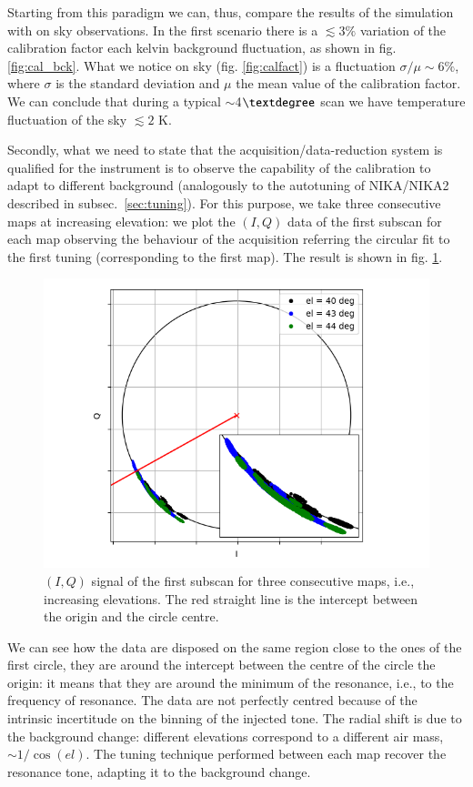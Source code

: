 \documentclass[twocolumn,traditabstract]{aa}\\
\begin{document}
Starting from this paradigm we can, thus, compare the results of the simulation with on sky observations. In the first scenario there is a $\lesssim 3\%$ variation of the calibration factor each kelvin background fluctuation, as shown in fig. \ref{fig:cal_bck}. What we notice on sky (fig. \ref{fig:calfact}) is a fluctuation $\sigma/\mu\sim6\%$, where $\sigma$ is the standard deviation and $\mu$ the mean value of the calibration factor. We can conclude that during a typical $\sim$4$\textdegree$ scan we have temperature fluctuation of the sky $\lesssim 2$ K.

Secondly, what we need to state that the acquisition/data-reduction system is qualified for the instrument is to observe the capability of the calibration to adapt to different background (analogously to the autotuning of NIKA/NIKA2 described in subsec.~\ref{sec:tuning}). For this purpose, we take three consecutive maps at increasing elevation: we plot the $(I,Q)$ data of the first subscan for each map observing the behaviour of the acquisition referring the circular fit to the first tuning (corresponding to the first map). The result is shown in fig. \ref{fig:autotuning}.

\begin{figure}[htf]
	\centering
	\includegraphics[width=.5\textwidth]{4.results/autotuning.png}
	\caption{$(I,Q)$ signal of the first subscan for three consecutive maps, i.e., increasing elevations. The red straight line is the intercept between the origin and the circle centre.}
	\label{fig:autotuning}
\end{figure}

\noindent We can see how the data are disposed on the same region close to the ones of the first circle, they are around the intercept between the centre of the circle the origin: it means that they are around the minimum of the resonance, i.e., to the frequency of resonance. The data are not perfectly centred because of the intrinsic incertitude on the binning of the injected tone. The radial shift is due to the background change: different elevations correspond to a different air mass, $\sim 1/\cos(el)$. The tuning technique performed between each map recover the resonance tone, adapting it to the background change.
\end{document}
